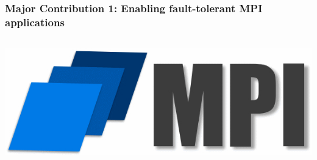 \begin{frame}
  \frametitle{Major Contribution 1: Enabling fault-tolerant MPI applications}

  \begin{columns}
    \begin{column}{.4\textwidth}
      \begin{minipage}{\linewidth}
        \begin{center}
          \includegraphics[width=.9\linewidth]{MPIlogo.jpg}
          

\end{center}
\end{minipage}
\end{column}
\end{columns}
\end{frame}
